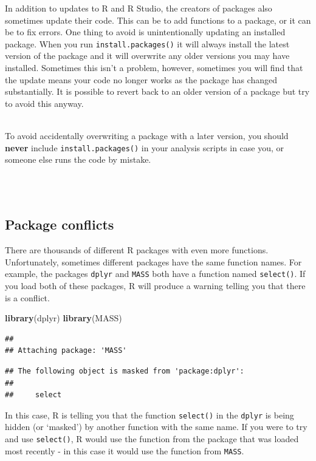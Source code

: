 \documentclass[]{book}
\newenvironment{Shaded}{\begin{snugshade}}{\end{snugshade}}
\newcommand{\KeywordTok}[1]{\textcolor[rgb]{0.13,0.29,0.53}{\textbf{#1}}}
\newcommand{\NormalTok}[1]{#1}
\newenvironment{danger}
    {
    \hline\\
    }
    { 
    \\\\\hline
    }
\begin{document}
In addition to updates to R and R Studio, the creators of packages also sometimes update their code. This can be to add functions to a package, or it can be to fix errors. One thing to avoid is unintentionally updating an installed package. When you run \texttt{install.packages()} it will always install the latest version of the package and it will overwrite any older versions you may have installed. Sometimes this isn't a problem, however, sometimes you will find that the update means your code no longer works as the package has changed substantially. It is possible to revert back to an older version of a package but try to avoid this anyway.

\begin{danger}
To avoid accidentally overwriting a package with a later version, you
should \textbf{never} include \texttt{install.packages()} in your
analysis scripts in case you, or someone else runs the code by mistake.
\end{danger}

\hypertarget{conflicts}{%
\subsection{Package conflicts}\label{conflicts}}

There are thousands of different R packages with even more functions. Unfortunately, sometimes different packages have the same function names. For example, the packages \texttt{dplyr} and \texttt{MASS} both have a function named \texttt{select()}. If you load both of these packages, R will produce a warning telling you that there is a conflict.

\begin{Shaded}
\begin{Highlighting}[]
\KeywordTok{library}\NormalTok{(dplyr)}
\KeywordTok{library}\NormalTok{(MASS)}
\end{Highlighting}
\end{Shaded}

\begin{verbatim}
## 
## Attaching package: 'MASS'
\end{verbatim}

\begin{verbatim}
## The following object is masked from 'package:dplyr':
## 
##     select
\end{verbatim}

In this case, R is telling you that the function \texttt{select()} in the \texttt{dplyr} is being hidden (or `masked') by another function with the same name. If you were to try and use \texttt{select()}, R would use the function from the package that was loaded most recently - in this case it would use the function from \texttt{MASS}.
\end{document}
